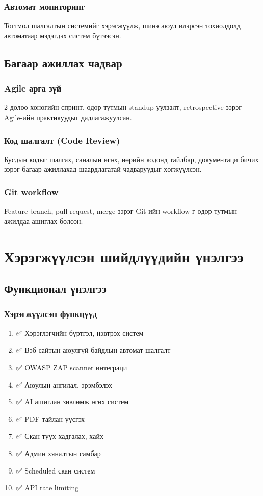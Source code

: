 \documentclass[main.tex]{subfiles}
\begin{document}
\subsubsection{Автомат мониторинг}
Тогтмол шалгалтын системийг хэрэгжүүлж, шинэ аюул илэрсэн тохиолдолд автоматаар мэдэгдэх систем бүтээсэн.

\subsection{Багаар ажиллах чадвар}

\subsubsection{Agile арга зүй}
2 долоо хоногийн спринт, өдөр тутмын standup уулзалт, retrospective зэрэг Agile-ийн практикуудыг дадлагажуулсан.

\subsubsection{Код шалгалт (Code Review)}
Бусдын кодыг шалгах, саналын өгөх, өөрийн кодонд тайлбар, документаци бичих зэрэг багаар ажиллахад шаардлагатай чадваруудыг хөгжүүлсэн.

\subsubsection{Git workflow}
Feature branch, pull request, merge зэрэг Git-ийн workflow-г өдөр тутмын ажилдаа ашиглах болсон.

\section{Хэрэгжүүлсэн шийдлүүдийн үнэлгээ}

\subsection{Функционал үнэлгээ}

\subsubsection{Хэрэгжүүлсэн функцүүд}
\begin{enumerate}
    \item ✅ Хэрэглэгчийн бүртгэл, нэвтрэх систем
    \item ✅ Вэб сайтын аюулгүй байдлын автомат шалгалт
    \item ✅ OWASP ZAP scanner интеграци
    \item ✅ Аюулын ангилал, эрэмбэлэх
    \item ✅ AI ашиглан зөвлөмж өгөх систем
    \item ✅ PDF тайлан үүсгэх
    \item ✅ Скан түүх хадгалах, хайх
    \item ✅ Админ хяналтын самбар
    \item ✅ Scheduled скан систем
    \item ✅ API rate limiting
\end{enumerate}
\end{document}
